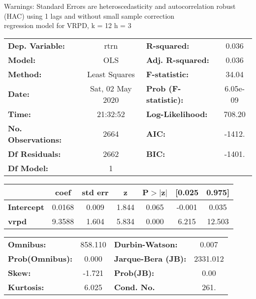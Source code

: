 Warnings: \newline
 [1] Standard Errors are heteroscedasticity and autocorrelation robust (HAC) using 1 lags and without small sample correction\\ 

regression model for VRPD, k = 12 h = 3\begin{center}
\begin{tabular}{lclc}
\toprule
\textbf{Dep. Variable:}    &       rtrn       & \textbf{  R-squared:         } &     0.036   \\
\textbf{Model:}            &       OLS        & \textbf{  Adj. R-squared:    } &     0.036   \\
\textbf{Method:}           &  Least Squares   & \textbf{  F-statistic:       } &     34.04   \\
\textbf{Date:}             & Sat, 02 May 2020 & \textbf{  Prob (F-statistic):} &  6.05e-09   \\
\textbf{Time:}             &     21:32:52     & \textbf{  Log-Likelihood:    } &    708.20   \\
\textbf{No. Observations:} &        2664      & \textbf{  AIC:               } &    -1412.   \\
\textbf{Df Residuals:}     &        2662      & \textbf{  BIC:               } &    -1401.   \\
\textbf{Df Model:}         &           1      & \textbf{                     } &             \\
\bottomrule
\end{tabular}
\begin{tabular}{lcccccc}
                   & \textbf{coef} & \textbf{std err} & \textbf{z} & \textbf{P$> |$z$|$} & \textbf{[0.025} & \textbf{0.975]}  \\
\midrule
\textbf{Intercept} &       0.0168  &        0.009     &     1.844  &         0.065        &       -0.001    &        0.035     \\
\textbf{vrpd}      &       9.3588  &        1.604     &     5.834  &         0.000        &        6.215    &       12.503     \\
\bottomrule
\end{tabular}
\begin{tabular}{lclc}
\textbf{Omnibus:}       & 858.110 & \textbf{  Durbin-Watson:     } &    0.007  \\
\textbf{Prob(Omnibus):} &   0.000 & \textbf{  Jarque-Bera (JB):  } & 2331.012  \\
\textbf{Skew:}          &  -1.721 & \textbf{  Prob(JB):          } &     0.00  \\
\textbf{Kurtosis:}      &   6.025 & \textbf{  Cond. No.          } &     261.  \\
\bottomrule
\end{tabular}
\end{center}

